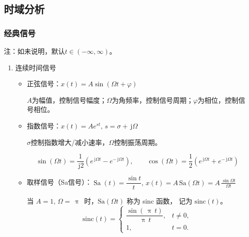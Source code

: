 \documentclass[UTF8,fontset=fandol,zihao=5]{ctexart}
\newcommand{\jj}{\,\mathrm{j}}
\newcommand{\ppi}{\,\uppi\,}
\begin{document}
\subsection{时域分析}

\subsubsection{经典信号}

注：如未说明，默认$t \in \left ( -\infty, \infty \right )$。

\begin{enumerate}
    \item 连续时间信号
    \begin{itemize}
      \item 正弦信号：$x(t)=A\sin\left ( \varOmega t + \varphi \right )$
      
      $A$为幅值，控制信号幅度；$\varOmega$为角频率，控制信号周期；$\varphi$为相位，控制信号相位。

      \item 指数信号：$x(t)=Ae^{st}, \, s = \sigma + \jj \varOmega$
    
      $\sigma$控制指数增大/减小速率，$\varOmega$控制振荡周期。

      \begin{methodbox}[正弦信号与指数信号关系]
        \[
        \sin \left ( \varOmega t \right ) = \frac{1}{\jj 2} \left ( e^{\jj \varOmega t} - e^{-\jj \varOmega t} \right ), \qquad
        \cos \left ( \varOmega t \right ) = \frac{1}{2} \left ( e^{\jj \varOmega t} + e^{-\jj \varOmega t} \right )
        \]
      \end{methodbox}
    
      \item 取样信号（Sa信号）：$\operatorname{Sa}(t)=\dfrac{\sin t}{t}, \, \displaystyle x(t) = A \, \mathrm{Sa}(\varOmega t) = A \, \frac{\sin \varOmega t}{\varOmega t}$
      
      \begin{methodbox}[sinc函数]
        当 $A=1, \, \varOmega = \ppi$ 时，$\mathrm{Sa}(\varOmega t)$ 称为 sinc 函数，
        记为 $\mathrm{sinc}(t)$。
        \[
        \mathrm{sinc}(t)=
        \begin{cases}
        \dfrac{\sin(\ppi t)}{\ppi t}, & t\neq 0,\\[6pt]
        1, & t=0.
        \end{cases}
        \]
      \end{methodbox}
    \end{itemize}


\end{enumerate}
\end{document}
